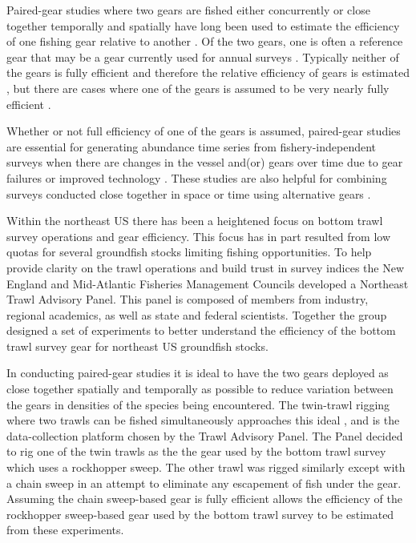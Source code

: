 \documentclass[
  12pt,
]{article}
\begin{document}
Paired-gear studies where two gears are fished either concurrently or
close together temporally and spatially have long been used to estimate
the efficiency of one fishing gear relative to another
\citep[e.g.,][]{gulland64,bourne65}. Of the two gears, one is often a
reference gear that may be a gear currently used for annual surveys
\citep[e.g.,][]{munrosomerton01}. Typically neither of the gears is
fully efficient and therefore the relative efficiency of gears is
estimated \citep[e.g.,][]{miller13,kotwickietal17}, but there are cases
where one of the gears is assumed to be very nearly fully efficient
\citep[e.g.,][]{somertonetal13, milleretal19}.

Whether or not full efficiency of one of the gears is assumed,
paired-gear studies are essential for generating abundance time series
from fishery-independent surveys when there are changes in the vessel
and(or) gears over time due to gear failures or improved technology
\citep{pelletier98}. These studies are also helpful for combining
surveys conducted close together in space or time using alternative
gears \citep{kotwickietal13}.

Within the northeast US there has been a heightened focus on bottom
trawl survey operations and gear efficiency. This focus has in part
resulted from low quotas for several groundfish stocks limiting fishing
opportunities. To help provide clarity on the trawl operations and build
trust in survey indices the New England and Mid-Atlantic Fisheries
Management Councils developed a Northeast Trawl Advisory Panel. This
panel is composed of members from industry, regional academics, as well
as state and federal scientists. Together the group designed a set of
experiments to better understand the efficiency of the bottom trawl
survey gear for northeast US groundfish stocks.

In conducting paired-gear studies it is ideal to have the two gears
deployed as close together spatially and temporally as possible to
reduce variation between the gears in densities of the species being
encountered. The twin-trawl rigging \citep{kragetal15} where two trawls
can be fished simultaneously approaches this ideal \citep{ices96}, and
is the data-collection platform chosen by the Trawl Advisory Panel. The
Panel decided to rig one of the twin trawls as the the gear used by the
bottom trawl survey which uses a rockhopper sweep. The other trawl was
rigged similarly except with a chain sweep in an attempt to eliminate
any escapement of fish under the gear. Assuming the chain sweep-based
gear is fully efficient allows the efficiency of the rockhopper
sweep-based gear used by the bottom trawl survey to be estimated from
these experiments.
\end{document}
